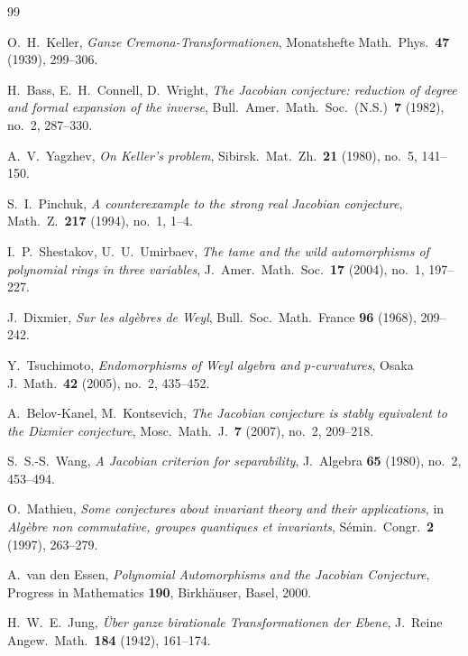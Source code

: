 \documentclass[12pt,a4paper]{amsart}
\theoremstyle{definition}
\theoremstyle{remark}
\begin{document}
\begin{thebibliography}{99}

O.~H.\ Keller,
\textit{Ganze Cremona-Transformationen},
Monatshefte Math.\ Phys.\ \textbf{47} (1939), 299--306.

H.\ Bass, E.\ H.\ Connell, D.\ Wright,
\textit{The Jacobian conjecture: reduction of degree and formal expansion of the inverse},
Bull.\ Amer.\ Math.\ Soc.\ (N.S.)\ \textbf{7} (1982), no.\ 2, 287--330.

A.~V.\ Yagzhev,
\textit{On Keller's problem},
Sibirsk.\ Mat.\ Zh.\ \textbf{21} (1980), no.\ 5, 141--150.

S.~I.\ Pinchuk,
\textit{A counterexample to the strong real Jacobian conjecture},
Math.\ Z.\ \textbf{217} (1994), no.\ 1, 1--4.

I.~P.\ Shestakov, U.~U.\ Umirbaev,
\textit{The tame and the wild automorphisms of polynomial rings in three variables},
J.\ Amer.\ Math.\ Soc.\ \textbf{17} (2004), no.\ 1, 197--227.

J.\ Dixmier,
\textit{Sur les algèbres de Weyl},
Bull.\ Soc.\ Math.\ France \textbf{96} (1968), 209--242.

Y.\ Tsuchimoto,
\textit{Endomorphisms of Weyl algebra and $p$-curvatures},
Osaka J.\ Math.\ \textbf{42} (2005), no.\ 2, 435--452.

A.\ Belov-Kanel, M.\ Kontsevich,
\textit{The Jacobian conjecture is stably equivalent to the Dixmier conjecture},
Mosc.\ Math.\ J.\ \textbf{7} (2007), no.\ 2, 209--218.

S.~S.-S.\ Wang,
\textit{A Jacobian criterion for separability},
J.\ Algebra \textbf{65} (1980), no.\ 2, 453--494.

O.\ Mathieu,
\textit{Some conjectures about invariant theory and their applications},
in \textit{Algèbre non commutative, groupes quantiques et invariants},
Sémin.\ Congr.\ \textbf{2} (1997), 263--279.

A.\ van den Essen,
\textit{Polynomial Automorphisms and the Jacobian Conjecture},
Progress in Mathematics \textbf{190},
Birkhäuser, Basel, 2000.

H.~W.~E.\ Jung,
\textit{Über ganze birationale Transformationen der Ebene},
J.\ Reine Angew.\ Math.\ \textbf{184} (1942), 161--174.

\end{thebibliography}
\end{document}
